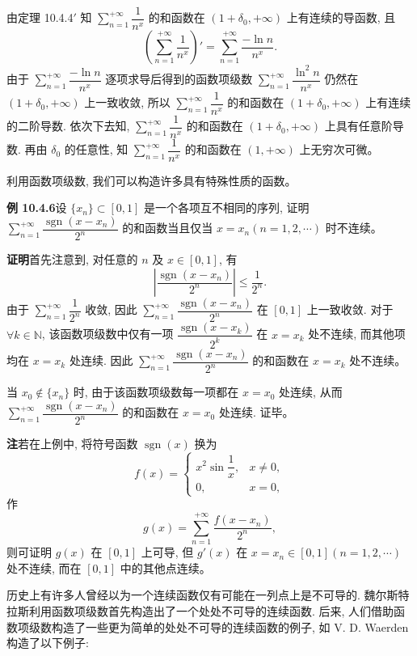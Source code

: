 \documentclass[UTF8, 12pt, fontset=fandol, oneside]{ctexart}
\begin{document}
由定理 10.4.4$'$ 知 $\sum\limits_{n=1}^{+\infty}\dfrac1{n^x}$ 的和函数在 $(1+\delta_0,+\infty)$ 上有连续的导函数, 且
\[
  \left(\sum_{n=1}^{+\infty}\frac1{n^x}\right)'
  =\sum_{n=1}^{+\infty}\frac{-\ln n}{n^x}.
\]
由于 $\sum\limits_{n=1}^{+\infty}\dfrac{-\ln n}{n^x}$ 逐项求导后得到的函数项级数 $\sum\limits_{n=1}^{+\infty}\dfrac{\ln^2 n}{n^x}$ 仍然在 $(1+\delta_0,+\infty)$ 上一致收敛, 所以 $\sum\limits_{n=1}^{+\infty}\dfrac1{n^x}$ 的和函数在 $(1+\delta_0,+\infty)$ 上有连续的二阶导数. 依次下去知, $\sum\limits_{n=1}^{+\infty}\dfrac1{n^x}$ 的和函数在 $(1+\delta_0,+\infty)$ 上具有任意阶导数. 再由 $\delta_0$ 的任意性, 知 $\sum\limits_{n=1}^{+\infty}\dfrac1{n^x}$ 的和函数在 $(1,+\infty)$ 上无穷次可微。

利用函数项级数, 我们可以构造许多具有特殊性质的函数。

\noindent\textbf{例 10.4.6}\quad 设 $\{x_n\}\subset[0,1]$ 是一个各项互不相同的序列, 证明 $\sum\limits_{n=1}^{+\infty}\dfrac{\operatorname{sgn}(x-x_n)}{2^n}$ 的和函数当且仅当 $x=x_n(n=1,2,\cdots)$ 时不连续。

\noindent\textbf{证明}\quad 首先注意到, 对任意的 $n$ 及 $x\in[0,1]$, 有
\[
  \left|\frac{\operatorname{sgn}(x-x_n)}{2^n}\right|\leq\frac1{2^n}.
\]
由于 $\sum\limits_{n=1}^{+\infty}\dfrac1{2^n}$ 收敛, 因此 $\sum\limits_{n=1}^{+\infty}\dfrac{\operatorname{sgn}(x-x_n)}{2^n}$ 在 $[0,1]$ 上一致收敛. 对于 $\forall k\in\mathbb N$, 该函数项级数中仅有一项 $\dfrac{\operatorname{sgn}(x-x_k)}{2^k}$ 在 $x=x_k$ 处不连续, 而其他项均在 $x=x_k$ 处连续. 因此 $\sum\limits_{n=1}^{+\infty}\dfrac{\operatorname{sgn}(x-x_n)}{2^n}$ 的和函数在 $x=x_k$ 处不连续。

当 $x_0\notin\{x_n\}$ 时, 由于该函数项级数每一项都在 $x=x_0$ 处连续, 从而 $\sum\limits_{n=1}^{+\infty}\dfrac{\operatorname{sgn}(x-x_n)}{2^n}$ 的和函数在 $x=x_0$ 处连续. 证毕。

\noindent\textbf{注}\quad 若在上例中, 将符号函数 $\operatorname{sgn}(x)$ 换为
\[
  f(x)=
  \begin{cases}
    x^2\sin\dfrac1x, & x\ne0,\\
    0, & x=0,
  \end{cases}
\]
作
\[
  g(x)=\sum_{n=1}^{+\infty}\frac{f(x-x_n)}{2^n},
\]
则可证明 $g(x)$ 在 $[0,1]$ 上可导, 但 $g'(x)$ 在 $x=x_n\in[0,1](n=1,2,\cdots)$ 处不连续, 而在 $[0,1]$ 中的其他点连续。

历史上有许多人曾经以为一个连续函数仅有可能在一列点上是不可导的. 魏尔斯特拉斯利用函数项级数首先构造出了一个处处不可导的连续函数. 后来, 人们借助函数项级数构造了一些更为简单的处处不可导的连续函数的例子, 如 V. D. Waerden 构造了以下例子:
\end{document}
